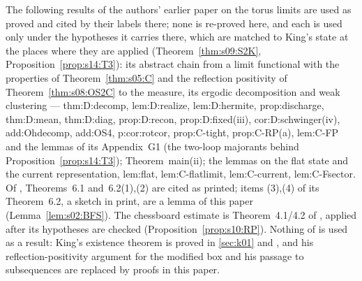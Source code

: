 \begin{remark}\label{rem:s03:companion-inputs}
The following results of the authors' earlier paper on the torus limits \cite{SymPhase} are used as proved and cited by their labels there; none is re-proved here, and each is used only under the hypotheses it carries there, which are matched to King's state at the places where they are applied (Theorem~\ref{thm:s09:S2K}, Proposition~\ref{prop:s14:T3}): its abstract chain from a limit functional with the properties of Theorem~\ref{thm:s05:C} and the reflection positivity of Theorem~\ref{thm:s08:OS2C} to the measure, its ergodic decomposition and weak clustering --- thm:D:decomp, lem:D:realize, lem:D:hermite, prop:discharge, thm:D:mean, thm:D:diag, prop:D:recon, prop:D:fixed(iii), cor:D:schwinger(iv), add:Ohdecomp, add:OS4, p:cor:rotcor, prop:C-tight, prop:C-RP(a), lem:C-FP and the lemmas of its Appendix~G1 (the two-loop majorants behind Proposition~\ref{prop:s14:T3}); Theorem~main(ii); the lemmas on the flat state and the current representation, lem:flat, lem:C-flatlimit, lem:C-current, lem:C-Fsector.
Of \cite{BFS1}, Theorems~6.1 and~6.2(1),(2) are cited as printed; items (3),(4) of its Theorem~6.2, a sketch in print, are a lemma of this paper (Lemma~\ref{lem:s02:BFS}). The chessboard estimate is Theorem~4.1/4.2 of \cite{FILS78}, applied after its hypotheses are checked (Proposition~\ref{prop:s10:RP}). Nothing of \cite{K1,K2} is used as a result: King's existence theorem is proved in \cref{sec:k01} and , and his reflection-positivity argument for the modified box and his passage to subsequences are replaced by proofs in this paper.
\end{remark}
